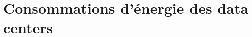 {}

\ChTitleVar{\scshape \raggedleft \LARGE  \bfseries}


\chapter{Consommations d'énergie des data centers} %
\vspace{3cm}
\minitoc

\clearpage



\label{Chapitre1} %






